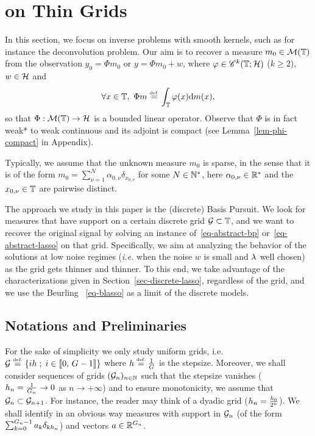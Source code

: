 
\section{\lasso on Thin Grids}
\label{sec-discbp-thin}

In this section, we focus on inverse problems with smooth kernels, such as for instance the deconvolution problem. 
Our aim is to recover a measure $m_0\in\mathcal{M}(\mathbb{T})$ from the observation $y_0=\Phi m_0$ or $y=\Phi m_0+w$, where $\varphi\in \mathscr{C}^k(\mathbb{T};\mathcal{H})$ ($k\geq 2$), $w\in \mathcal{H}$ and 
\begin{align}
\forall x\in \mathbb{T},\  \Phi m \stackrel{\mbox{\upshape\tiny def.}}{=} \int_{\mathbb{T}} \varphi(x) \mathrm{d} m(x),
\end{align}
so that $\Phi:\mathcal{M}(\mathbb{T})\rightarrow \mathcal{H}$ is a bounded linear operator. Observe that $\Phi$ is in fact weak* to weak continuous and its adjoint is compact (see Lemma~\ref{lem-phi-compact} in Appendix).

Typically, we assume that the unknown measure $m_0$ is sparse, in the sense that it is of the form $m_0=\sum_{\nu=1}^N \alpha_{0,\nu}\delta_{x_{0,\nu}}$ for some $N\in\mathbb{N}^*$, here $\alpha_{0,\nu}\in \mathbb{R}^*$ and the $x_{0,\nu}\in \mathbb{T}$ are pairwise distinct. 

The approach we study in this paper is the (discrete) Basis Pursuit. We look for measures that have support on a certain discrete grid $\mathcal{G}\subset \mathbb{T}$, and we want to recover the original signal by solving an instance of~\eqref{eq-abstract-bp} or~\eqref{eq-abstract-lasso} on that grid. Specifically, we aim at analyzing the behavior of the solutions at low noise regimes (\textit{i.e.} when the noise $w$ is small and $\lambda$ well chosen) as the grid gets thinner and thinner.
To this end, we take advantage of the characterizations given in Section~\ref{sec-discrete-lasso}, regardless of the grid, and we use the Beurling \lasso~\eqref{eq-blasso} as a limit of the discrete models.


\subsection{Notations and Preliminaries}

For the sake of simplicity we only study uniform grids, i.e. $\mathcal{G} \stackrel{\mbox{\upshape\tiny def.}}{=} \left\{ ih \;;\; i\in \llbracket 0,\,G-1 \rrbracket \right\}$ where $h \stackrel{\mbox{\upshape\tiny def.}}{=} \frac{1}{G}$ is the stepsize. Moreover, we shall consider sequences of grids $(\mathcal{G}_n)_{n\in\mathbb{N}}$ such that the stepsize vanishes (${h_n}=\frac{1}{{G_n}}\to 0$ as $n\to+\infty$) and to ensure monotonicity, we assume that $\mathcal{G}_{n}\subset \mathcal{G}_{n+1}$. For instance, the reader may think of a dyadic grid (\ie ${h_n}=\frac{h_0}{2^n}$).
We shall identify in an obvious way measures with support in $\mathcal{G}_n$ (\ie of the form $\sum_{k=0}^{{G_n}-1} a_k \delta_{k{h_n}}$) and vectors $a\in\mathbb{R}^{G_n}$.

